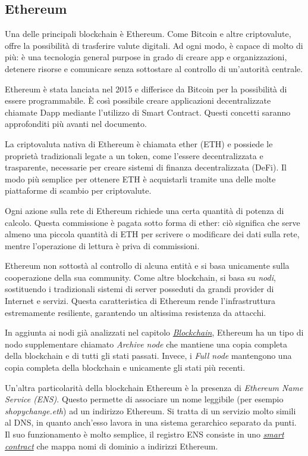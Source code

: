 \subsection{Ethereum}

Una delle principali blockchain è Ethereum. Come Bitcoin e altre criptovalute, offre la possibilità di trasferire valute digitali. 
Ad ogni modo, è capace di molto di più: è una tecnologia general purpose in grado di creare app e organizzazioni, detenere risorse e comunicare senza sottostare al controllo di un'autorità centrale. \cite{what-is-ethereum}

Ethereum è stata lanciata nel 2015 e differisce da Bitcoin per la possibilità di essere programmabile. 
È così possibile creare applicazioni decentralizzate chiamate Dapp mediante l'utilizzo di Smart Contract. Questi concetti saranno approfonditi più avanti nel documento. 

La criptovaluta nativa di Ethereum è chiamata ether (ETH) e possiede le proprietà tradizionali legate a un token, come l'essere decentralizzata e trasparente, necessarie per creare sistemi di finanza decentralizzata (DeFi).
Il modo più semplice per ottenere ETH è acquistarli tramite una delle molte piattaforme di scambio per criptovalute. \cite{what-is-ether}

Ogni azione sulla rete di Ethereum richiede una certa quantità di potenza di calcolo.
Questa commissione è pagata sotto forma di ether: ciò significa che serve almeno una piccola quantità di ETH per scrivere o modificare dei dati sulla rete, mentre l'operazione di lettura è priva di commissioni.

Ethereum non sottostà al controllo di alcuna entità e si basa unicamente sulla cooperazione della sua community.
Come altre blockchain, si basa su \textit{nodi}, sostituendo i tradizionali sistemi di server posseduti da grandi provider di Internet e servizi. Questa caratteristica di Ethereum rende l'infrastruttura estremamente resiliente, garantendo un altissima resistenza da attacchi. \cite{what-is-ethereum}

In aggiunta ai nodi già analizzati nel capitolo \hyperref[sec:blockchain]{\textit{Blockchain}}, Ethereum ha un tipo di nodo supplementare chiamato \textit{Archive node} che mantiene una copia completa della blockchain e di tutti gli stati passati. Invece, i \textit{Full node} mantengono una copia completa della blockchain e unicamente gli stati più recenti. \cite{ethereum-nodes}

Un'altra particolarità della blockchain Ethereum è la presenza di \textit{Ethereum Name Service (ENS)}. Questo permette di associare un nome leggibile (per esempio \textit{shopychange.eth}) ad un indirizzo Ethereum. Si tratta di un servizio molto simili al DNS, in quanto anch'esso lavora in una sistema gerarchico separato da punti. Il suo funzionamento è molto semplice, il registro ENS consiste in uno \hyperref[sec:smart-contract]{\textit{smart contract}} che mappa nomi di dominio a indirizzi Ethereum. \cite{ethereum-ens}

